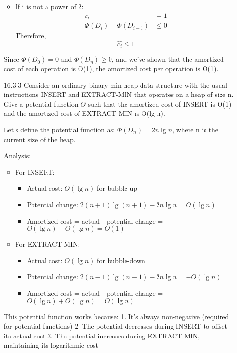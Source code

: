 \documentclass{article}
\theoremstyle{definition}
\begin{document}
\begin{enumerate}
\begin{itemize}
        \item If i is not a power of 2:
            \begin{align*}
                c_i &= 1 \\
                \Phi(D_i) - \Phi(D_{i-1}) &\leq 0
            \end{align*}
            Therefore,
            \[ \hat{c_i} \leq 1 \]
    \end{itemize}

    Since $\Phi(D_0) = 0$ and $\Phi(D_n) \geq 0$, and we've shown that the amortized cost of each operation is O(1), the amortized cost per operation is O(1).
    
    \item[16.3-3] Consider an ordinary binary min-heap data structure with the usual instructions INSERT and EXTRACT-MIN that operates on a heap of size n. Give a potential function $\Theta$ such that the amortized cost of INSERT is O(1) and the amortized cost of EXTRACT-MIN is O(lg n).
    
    Let's define the potential function as: $\Phi(D_n) = 2n\lg n$, where n is the current size of the heap.

    Analysis:
    \begin{itemize}
        \item For INSERT:
            \begin{itemize}
                \item Actual cost: $O(\lg n)$ for bubble-up
                \item Potential change: $2(n+1)\lg(n+1) - 2n\lg n = O(\lg n)$
                \item Amortized cost = actual - potential change = $O(\lg n) - O(\lg n) = O(1)$
            \end{itemize}
        \item For EXTRACT-MIN:
            \begin{itemize}
                \item Actual cost: $O(\lg n)$ for bubble-down
                \item Potential change: $2(n-1)\lg(n-1) - 2n\lg n = -O(\lg n)$
                \item Amortized cost = actual - potential change = $O(\lg n) + O(\lg n) = O(\lg n)$
            \end{itemize}
    \end{itemize}

    This potential function works because:
    1. It's always non-negative (required for potential functions)
    2. The potential decreases during INSERT to offset its actual cost
    3. The potential increases during EXTRACT-MIN, maintaining its logarithmic cost


\end{enumerate}
\end{document}
